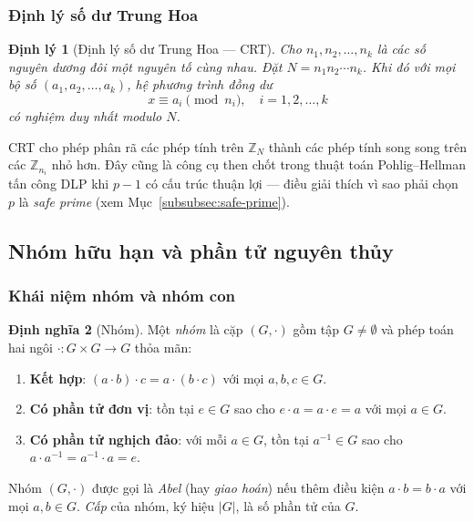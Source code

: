 \documentclass[12pt,a4paper]{report}
\newtheorem{theorem}{Định lý}[chapter]
\theoremstyle{definition}
\newtheorem{definition}[theorem]{Định nghĩa}
\theoremstyle{remark}
\begin{document}
\subsubsection{Định lý số dư Trung Hoa}

\begin{theorem}[Định lý số dư Trung Hoa --- CRT]
Cho $n_1, n_2, \ldots, n_k$ là các số nguyên dương đôi một nguyên tố cùng nhau. Đặt $N = n_1 n_2 \cdots n_k$. Khi đó với mọi bộ số $(a_1, a_2, \ldots, a_k)$, hệ phương trình đồng dư
\[
x \equiv a_i \pmod{n_i}, \quad i = 1, 2, \ldots, k
\]
có nghiệm duy nhất modulo $N$.
\end{theorem}

CRT cho phép phân rã các phép tính trên $\mathbb{Z}_N$ thành các phép tính song song trên các $\mathbb{Z}_{n_i}$ nhỏ hơn. Đây cũng là công cụ then chốt trong thuật toán Pohlig--Hellman tấn công DLP khi $p-1$ có cấu trúc thuận lợi --- điều giải thích vì sao phải chọn $p$ là \emph{safe prime} (xem Mục~\ref{subsubsec:safe-prime}).

\subsection{Nhóm hữu hạn và phần tử nguyên thủy}
\label{subsec:groups}

\subsubsection{Khái niệm nhóm và nhóm con}

\begin{definition}[Nhóm]
Một \emph{nhóm} là cặp $(G, \cdot)$ gồm tập $G \neq \emptyset$ và phép toán hai ngôi $\cdot : G \times G \to G$ thỏa mãn:
\begin{enumerate}
    \item \textbf{Kết hợp}: $(a \cdot b) \cdot c = a \cdot (b \cdot c)$ với mọi $a, b, c \in G$.
    \item \textbf{Có phần tử đơn vị}: tồn tại $e \in G$ sao cho $e \cdot a = a \cdot e = a$ với mọi $a \in G$.
    \item \textbf{Có phần tử nghịch đảo}: với mỗi $a \in G$, tồn tại $a^{-1} \in G$ sao cho $a \cdot a^{-1} = a^{-1} \cdot a = e$.
\end{enumerate}
Nhóm $(G, \cdot)$ được gọi là \emph{Abel} (hay \emph{giao hoán}) nếu thêm điều kiện $a \cdot b = b \cdot a$ với mọi $a, b \in G$. \emph{Cấp} của nhóm, ký hiệu $|G|$, là số phần tử của $G$.
\end{definition}
\end{document}
